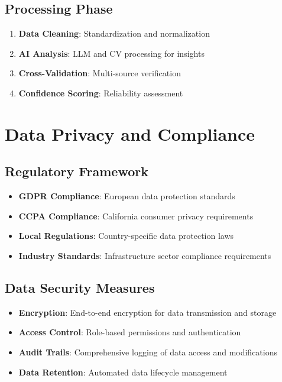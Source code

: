 \documentclass[business]{../templates/infraradar-main}
\begin{document}
\subsection{Processing Phase}
\begin{enumerate}
    \item \textbf{Data Cleaning}: Standardization and normalization
    \item \textbf{AI Analysis}: LLM and CV processing for insights
    \item \textbf{Cross-Validation}: Multi-source verification
    \item \textbf{Confidence Scoring}: Reliability assessment
\end{enumerate}

\section{Data Privacy and Compliance}

\subsection{Regulatory Framework}
\begin{itemize}
    \item \textbf{GDPR Compliance}: European data protection standards
    \item \textbf{CCPA Compliance}: California consumer privacy requirements
    \item \textbf{Local Regulations}: Country-specific data protection laws
    \item \textbf{Industry Standards}: Infrastructure sector compliance requirements
\end{itemize}

\subsection{Data Security Measures}
\begin{itemize}
    \item \textbf{Encryption}: End-to-end encryption for data transmission and storage
    \item \textbf{Access Control}: Role-based permissions and authentication
    \item \textbf{Audit Trails}: Comprehensive logging of data access and modifications
    \item \textbf{Data Retention}: Automated data lifecycle management
\end{itemize}
\end{document}
